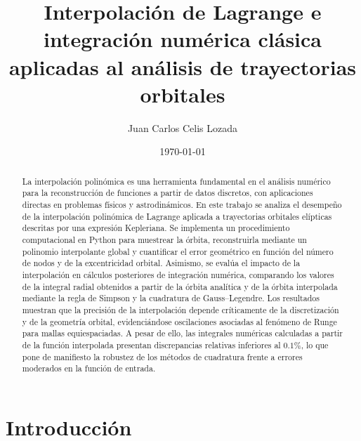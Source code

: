 \documentclass[reprint,amsmath,amssymb,aps]{revtex4-2}
\begin{document}
	
	\title{Interpolación de Lagrange e integración numérica clásica aplicadas al análisis de trayectorias orbitales}
	
	\author{Juan Carlos Celis Lozada}
	
	\date{\today}
	
	\begin{abstract}
		La interpolación polinómica es una herramienta fundamental en el análisis numérico para la reconstrucción de funciones a partir de datos discretos, con aplicaciones directas en problemas físicos y astrodinámicos. En este trabajo se analiza el desempeño de la interpolación polinómica de Lagrange aplicada a trayectorias orbitales elípticas descritas por una expresión Kepleriana. Se implementa un procedimiento computacional en Python para muestrear la órbita, reconstruirla mediante un polinomio interpolante global y cuantificar el error geométrico en función del número de nodos y de la excentricidad orbital. Asimismo, se evalúa el impacto de la interpolación en cálculos posteriores de integración numérica, comparando los valores de la integral radial obtenidos a partir de la órbita analítica y de la órbita interpolada mediante la regla de Simpson y la cuadratura de Gauss--Legendre. Los resultados muestran que la precisión de la interpolación depende críticamente de la discretización y de la geometría orbital, evidenciándose oscilaciones asociadas al fenómeno de Runge para mallas equiespaciadas. A pesar de ello, las integrales numéricas calculadas a partir de la función interpolada presentan discrepancias relativas inferiores al $0.1\%$, lo que pone de manifiesto la robustez de los métodos de cuadratura frente a errores moderados en la función de entrada.
	\end{abstract}
	
	
	\maketitle
	
	\section{Introducción}
	
\end{document}
